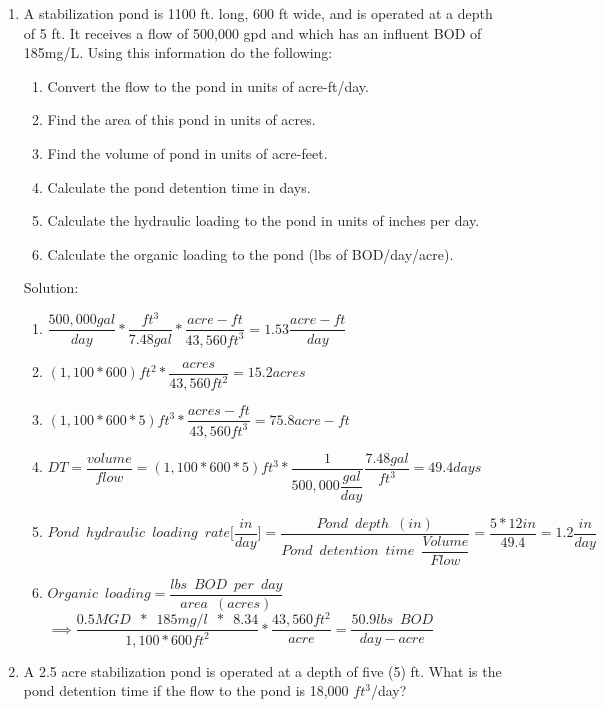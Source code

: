 \documentclass{article}
\begin{document}
\begin{enumerate}

\item A stabilization pond is 1100 ft. long, 600 ft wide, and is operated at a depth of 5 ft. It receives a flow of 500,000 gpd and which has an influent BOD of 185mg/L.  Using this information do the following:
\begin{enumerate}
\item Convert the flow to the pond in units of acre-ft/day.
\item Find the area of this pond in units of acres.
\item Find the volume of pond in units of acre-feet.
\item Calculate the pond detention time in days.
\item Calculate the hydraulic loading to the pond in units of inches per day.
\item Calculate the organic loading to the pond (lbs of BOD/day/acre).
\end{enumerate}


Solution:\\
\begin{enumerate}
\item $\dfrac{500,000gal}{day}*\dfrac{ft^3}{7.48gal}*\dfrac{acre-ft}{43,560ft^3}=\boxed{1.53\dfrac{acre-ft}{day}}$
\item $(1,100*600)ft^2*\dfrac{acres}{43,560 ft^2}=\boxed{15.2acres}$
\item $(1,100*600*5)ft^3*\dfrac{acres-ft}{43,560 ft^3}=\boxed{75.8 acre-ft}$
\item $DT=\dfrac{volume}{flow}=(1,100*600*5)ft^3*\dfrac{1}{500,000\dfrac{gal}{day}}\dfrac{7.48gal}{ft^3}=\boxed{49.4days}$
\item $Pond \enspace hydraulic \enspace loading \enspace rate \Bigg[\dfrac{in}{day}\Bigg]=\dfrac{Pond \enspace depth \enspace (in)}{Pond \enspace detention  \enspace time \enspace \dfrac{Volume}{Flow}}=\dfrac{5*12in}{49.4}=\boxed{1.2\dfrac{in}{day}}$ \\
\item $Organic \enspace loading=\dfrac{lbs \enspace BOD \enspace per \enspace day}{area \enspace (acres)}$\\
$\implies \dfrac{0.5MGD \enspace * \enspace 185mg/l \enspace * \enspace 8.34}{1,100*600ft^2}*\dfrac{43,560ft^2}{acre}=\boxed{\dfrac{50.9lbs \enspace BOD}{day-acre}}$
\end{enumerate}

\item  A 2.5 acre stabilization pond is operated at a depth of five (5) ft. What is the pond detention time if the flow to the pond is 18,000 $ft^3$/day? 


\end{enumerate}
\end{document}
